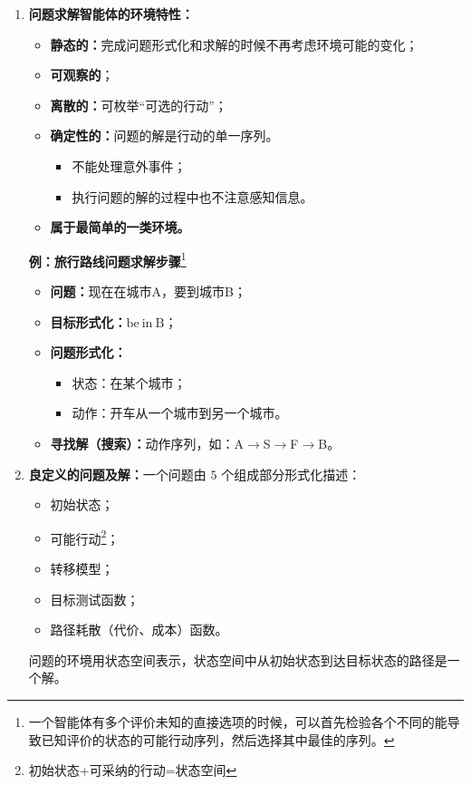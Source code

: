 \documentclass[../main.tex]{subfiles}
\begin{document}
\begin{enumerate}
    \item \textbf{问题求解智能体的环境特性：}
    \begin{itemize}
        \item \textbf{静态的：}完成问题形式化和求解的时候不再考虑环境可能的变化；
        \item \textbf{可观察的}；
        \item \textbf{离散的：}可枚举“可选的行动”；
        \item \textbf{确定性的：}问题的解是行动的单一序列。
        \begin{itemize}
            \item 不能处理意外事件；
            \item 执行问题的解的过程中也不注意感知信息。
        \end{itemize}
        \item \textbf{属于最简单的一类环境。}
    \end{itemize}

    {\small\kaishu
    \textbf{例：旅行路线问题求解步骤}\footnote{一个智能体有多个评价未知的直接选项的时候，可以首先检验各个不同的能导致已知评价的状态的可能行动序列，然后选择其中最佳的序列。}
    \begin{itemize}
        \item \textbf{问题：}现在在城市A，要到城市B；
        \item \textbf{目标形式化：}$\mathrm{be\ in\ B}$；
        \item \textbf{问题形式化：}
        \begin{itemize}
            \item 状态：在某个城市；
            \item 动作：开车从一个城市到另一个城市。
        \end{itemize}
        \item \textbf{寻找解（搜索）：}动作序列，如：A$\rightarrow$S$\rightarrow$F$\rightarrow$B。
    \end{itemize}
    }
     \item \textbf{良定义的问题及解：}一个问题由 $5$ 个组成部分形式化描述：
    \begin{itemize}
        \item 初始状态；
        \item 可能行动\footnote{初始状态+可采纳的行动=状态空间}；
        \item 转移模型；
        \item 目标测试函数；
        \item 路径耗散（代价、成本）函数。
    \end{itemize}
    问题的环境用状态空间表示，状态空间中从初始状态到达目标状态的路径是一个解。
\end{enumerate}
\end{document}
